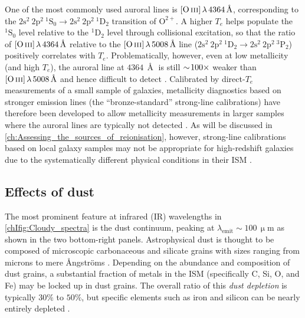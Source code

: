 One of the most commonly used auroral lines is $\OIIIf \, \lambda \, 4364 \, \Angstrom$, corresponding to the $\mathrm{2s^2 \: 2p^{2} \: ^1S_0} \rightarrow \mathrm{2s^2 \: 2p^{2} \: ^1D_2}$ transition of $\mathrm{O^{2+}}$. A higher $T_e$ helps populate the $\mathrm{^1S_0}$ level relative to the $\mathrm{^1D_2}$ level through collisional excitation, so that the ratio of $\OIIIf \, \lambda \, 4364 \, \Angstrom$ relative to the $\OIIIf \, \lambda \, 5008 \, \Angstrom$ line ($\mathrm{2s^2 \: 2p^{2} \: ^1D_2} \rightarrow \mathrm{2s^2 \: 2p^{2} \: ^3P_2}$) positively correlates with $T_e$. Problematically, however, even at low metallicity (and high $T_e$), the auroral line at $4364 \, \Angstrom$ is still $\sim \! 100 \times$ weaker than $\OIIIf \, \lambda \, 5008 \, \Angstrom$ and hence difficult to detect . Calibrated by direct-$T_e$ measurements of a small sample of galaxies, metallicity diagnostics based on stronger emission lines (the ``bronze-standard'' strong-line calibrations) have therefore been developed to allow metallicity measurements in larger samples where the auroral lines are typically not detected \citep[e.g.][]{2004MNRAS.348L..59P, 2008A&A...488..463M, 2017MNRAS.465.1384C}. As will be discussed in \cref{ch:Assessing_the_sources_of_reionisation}, however, strong-line calibrations based on local galaxy samples may not be appropriate for high-redshift galaxies due to the systematically different physical conditions in their ISM \citep[e.g.][]{2018ApJ...859..175B, 2022arXiv220712375C}.

\subsection{Effects of dust}
\label{chIssec:Effects_of_dust}

The most prominent feature at infrared (IR) wavelengths in \cref{chIfig:Cloudy_spectra} is the dust continuum, peaking at $\lambda_\text{emit} \sim 100 \, \mathrm{\upmu m}$ as shown in the two bottom-right panels. Astrophysical dust is thought to be composed of microscopic carbonaceous and silicate grains with sizes ranging from microns to mere {\AA}ngstr{\"o}ms \citep[down to the point where the ``grain'' is a single molecule;][]{2003ARA&A..41..241D}. Depending on the abundance and composition of dust grains, a substantial fraction of metals in the ISM (specifically C, Si, O, and Fe) may be locked up in dust grains. The overall ratio of this \textit{dust depletion} is typically $30\%$ to $50\%$, but specific elements such as iron and silicon can be nearly entirely depleted .

